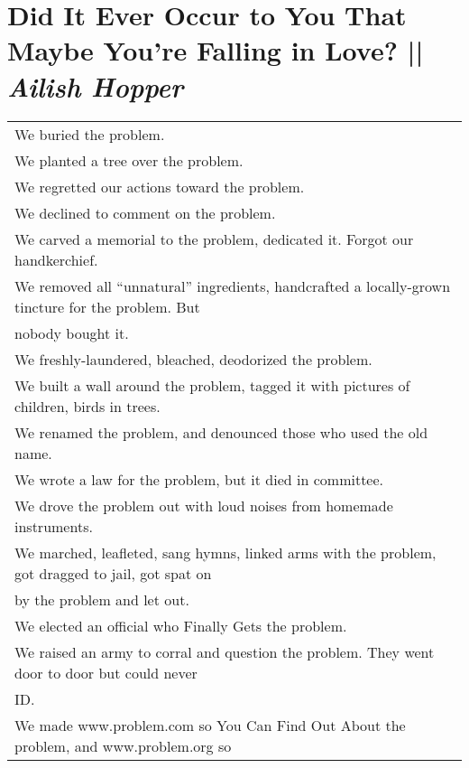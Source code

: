 \section[Did It Ever Occur to You That Maybe You’re Falling in Love?]{Did It Ever Occur to You That Maybe You’re Falling in Love? || \emph{Ailish Hopper} \hspace*{\fill}  \thepage}
\hspace{0pt}
\vfill
\begin{center}
\begin{tabular}{l}
We buried the problem.\\
We planted a tree over the problem.\\
We regretted our actions toward the problem.\\
We declined to comment on the problem.\\
We carved a memorial to the problem, dedicated it. Forgot our handkerchief.\\
We removed all “unnatural” ingredients, handcrafted a locally-grown tincture for the problem. But\\
\hspace{0.3cm} nobody bought it.\\
We freshly-laundered, bleached, deodorized the problem.\\
We built a wall around the problem, tagged it with pictures of children, birds in trees.\\
We renamed the problem, and denounced those who used the old name.\\
We wrote a law for the problem, but it died in committee.\\
We drove the problem out with loud noises from homemade instruments.\\
We marched, leafleted, sang hymns, linked arms with the problem, got dragged to jail, got spat on\\
\hspace{0.3cm} by the problem and let out.\\
We elected an official who Finally Gets the problem.\\
We raised an army to corral and question the problem. They went door to door but could never\\
\hspace{0.3cm} ID.\\
We made www.problem.com so You Can Find Out About the problem, and www.problem.org so\\

\end{tabular}
\end{center}
